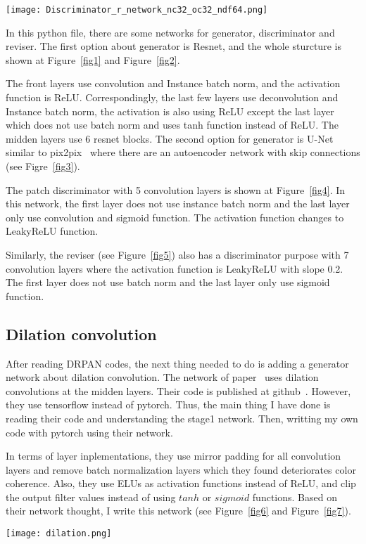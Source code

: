 \documentclass[a4paper]{article}
\begin{document}
\begin{figure*}
\begin{center}
\texttt{[image: Discriminator\_r\_network\_nc32\_oc32\_ndf64.png]}
\end{center}
\caption{The reviser structure.}
\label{fig5}
\end{figure*}

In this python file, there are some networks for generator, discriminator and reviser. The first option about generator is Resnet, and the whole sturcture is shown at Figure~\ref{fig1} and Figure~\ref{fig2}. 

The front layers use convolution and Instance batch norm, and the activation function is ReLU. Correspondingly, the last few layers use deconvolution and Instance batch norm, the activation is also using ReLU except the last layer which does not use batch norm and uses tanh function instead of ReLU. The midden layers use 6 resnet blocks. The second option for generator is U-Net similar to pix2pix~\cite{Image} where there are an autoencoder network with skip connections (see Figre~\ref{fig3}).

The patch discriminator with 5 convolution layers is shown at Figure~\ref{fig4}. In this network, the first layer does not use instance batch norm and the last layer only use convolution and sigmoid function. The activation function changes to LeakyReLU function. 

Similarly, the reviser (see Figure~\ref{fig5}) also has a discriminator purpose with 7 convolution layers where the activation function is LeakyReLU with slope 0.2. The first layer does not use batch norm and the last layer only use sigmoid function. 

\subsection{Dilation convolution}

After reading DRPAN codes, the next thing needed to do is adding a generator network about dilation convolution. The network of paper~\cite{Generative} uses dilation convolutions at the midden layers. Their code is published at github~\cite{Jia}. However, they use tensorflow instead of pytorch. Thus, the main thing I have done is reading their code and understanding the stage1 network. Then, writting my own code with pytorch using their network. 

In terms of layer inplementations, they use mirror padding for all convolution layers and remove batch normalization layers which they found deteriorates color coherence. Also, they use ELUs as activation functions instead of ReLU, and clip the output filter values instead of using $tanh$ or $sigmoid$ functions. Based on their network thought, I write this network (see Figure~\ref{fig6} and Figure~\ref{fig7}).
\begin{figure*}
\begin{center}
\texttt{[image: dilation.png]}
\end{center}
\caption{The layers of dilation convolution network.}
\label{fig6}
\end{figure*}
\end{document}
